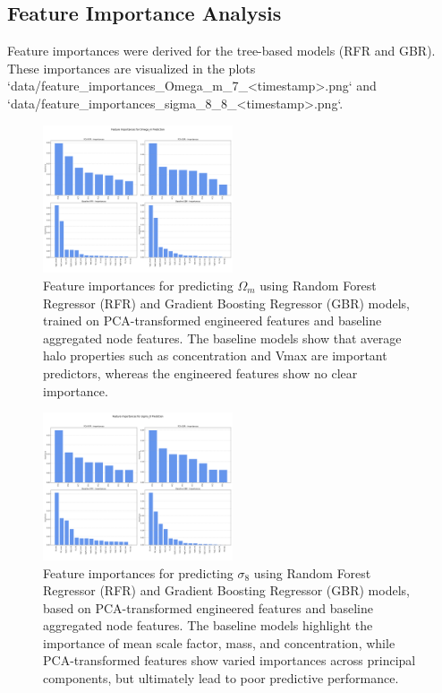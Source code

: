 \documentclass[twocolumn]{aastex631}
\begin{document}
\subsection{Feature Importance Analysis}

Feature importances were derived for the tree-based models (RFR and GBR). These importances are visualized in the plots `data/feature\_importances\_Omega\_m\_7_<timestamp>.png` and `data/feature\_importances\_sigma\_8\_8_<timestamp>.png`.

\begin{figure}[h!]
    \centering
    \includegraphics[width=0.5\textwidth]{../input_files/plots/feature_importances_Omega_m_7_20250527-135752.png}
    \caption{Feature importances for predicting $\Omega_m$ using Random Forest Regressor (RFR) and Gradient Boosting Regressor (GBR) models, trained on PCA-transformed engineered features and baseline aggregated node features. The baseline models show that average halo properties such as concentration and Vmax are important predictors, whereas the engineered features show no clear importance.}
    \label{fig:feature_importances_omega_m}
\end{figure}

\begin{figure}[h!]
    \centering
    \includegraphics[width=0.5\textwidth]{../input_files/plots/feature_importances_sigma_8_8_20250527-135752.png}
    \caption{Feature importances for predicting $\sigma_8$ using Random Forest Regressor (RFR) and Gradient Boosting Regressor (GBR) models, based on PCA-transformed engineered features and baseline aggregated node features. The baseline models highlight the importance of mean scale factor, mass, and concentration, while PCA-transformed features show varied importances across principal components, but ultimately lead to poor predictive performance.}
    \label{fig:feature_importances_sigma_8}
\end{figure}
\end{document}
